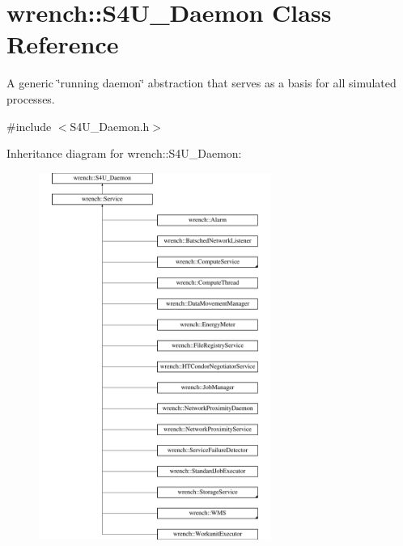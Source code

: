 \hypertarget{classwrench_1_1_s4_u___daemon}{}\section{wrench\+:\+:S4\+U\+\_\+\+Daemon Class Reference}
\label{classwrench_1_1_s4_u___daemon}


A generic \char`\"{}running daemon\char`\"{} abstraction that serves as a basis for all simulated processes.  




{\ttfamily \#include $<$S4\+U\+\_\+\+Daemon.\+h$>$}

Inheritance diagram for wrench\+:\+:S4\+U\+\_\+\+Daemon\+:\begin{figure}[H]
\begin{center}
\leavevmode
\includegraphics[height=12.000000cm]{classwrench_1_1_s4_u___daemon}
\end{center}
\end{figure}
